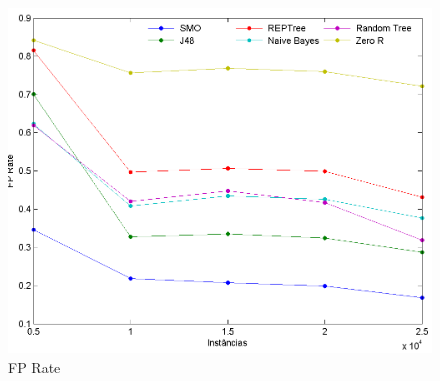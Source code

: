 \documentclass[
	12pt,				%
	openright,			%
	oneside,	
	a4paper,				%
	english,				%
	brazil				%
]{abntex2/abntex2} %
\begin{document}
\begin{figure}[!htb]
	\caption{\label{figfpRate} FP Rate}
	\begin{center}
		\includegraphics[scale=0.6]{graphs/fp_graph.png}
	\end{center}
\end{figure}
	

	
\end{document}
